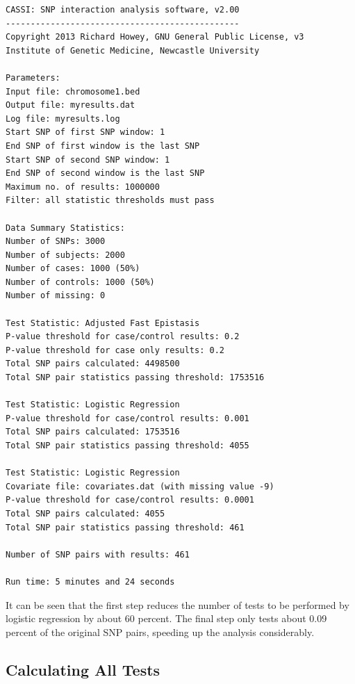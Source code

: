 \documentclass[a4paper,12pt]{article}
\begin{document}
\vspace{0.35cm} \begin{lstlisting}
CASSI: SNP interaction analysis software, v2.00
-----------------------------------------------
Copyright 2013 Richard Howey, GNU General Public License, v3
Institute of Genetic Medicine, Newcastle University

Parameters:
Input file: chromosome1.bed
Output file: myresults.dat
Log file: myresults.log
Start SNP of first SNP window: 1
End SNP of first window is the last SNP
Start SNP of second SNP window: 1
End SNP of second window is the last SNP
Maximum no. of results: 1000000
Filter: all statistic thresholds must pass

Data Summary Statistics:
Number of SNPs: 3000
Number of subjects: 2000
Number of cases: 1000 (50%)
Number of controls: 1000 (50%)
Number of missing: 0

Test Statistic: Adjusted Fast Epistasis
P-value threshold for case/control results: 0.2
P-value threshold for case only results: 0.2
Total SNP pairs calculated: 4498500
Total SNP pair statistics passing threshold: 1753516

Test Statistic: Logistic Regression
P-value threshold for case/control results: 0.001
Total SNP pairs calculated: 1753516
Total SNP pair statistics passing threshold: 4055

Test Statistic: Logistic Regression
Covariate file: covariates.dat (with missing value -9)
P-value threshold for case/control results: 0.0001
Total SNP pairs calculated: 4055
Total SNP pair statistics passing threshold: 461

Number of SNP pairs with results: 461

Run time: 5 minutes and 24 seconds

\end{lstlisting} \vspace{0.35cm}
It can be seen that the first step reduces the number of tests to be performed by logistic regression by about 60 percent. The final step only tests about 0.09 percent of the original SNP pairs, speeding up the analysis considerably. 


\subsection{Calculating All Tests}
\label{calculate-all}
\end{document}
